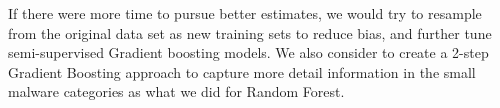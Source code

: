 \documentclass[11pt]{article}
\begin{document}
If there were more time to pursue better estimates, we would try to resample from the original data set as new training sets to reduce bias, and further tune semi-supervised Gradient boosting models. We also consider to create a 2-step Gradient Boosting approach to capture more detail information in the small malware categories as what we did for Random Forest.


\end{document}

